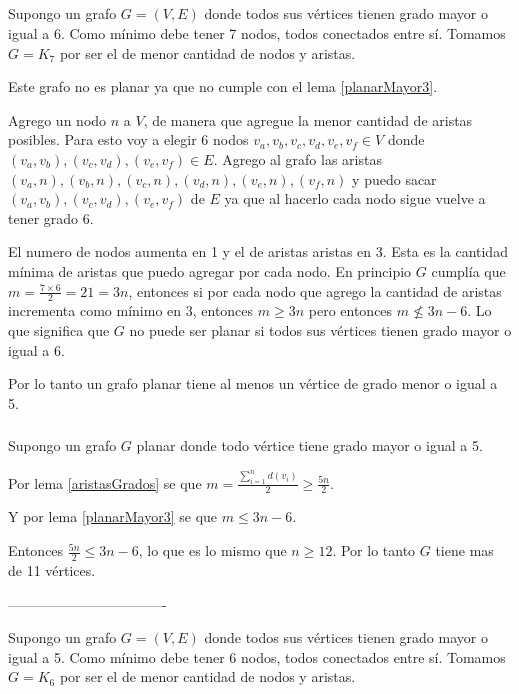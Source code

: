 \subsection{}

\subsubsection{}
Supongo un grafo $G = (V, E)$ donde todos sus vértices tienen grado mayor o igual a 6. Como mínimo debe tener 7 nodos, todos conectados entre sí. Tomamos $G = K_7$ por ser el de menor cantidad de nodos y aristas.

Este grafo no es planar ya que no cumple con el lema \ref{planarMayor3}.

Agrego un nodo $n$ a $V$, de manera que agregue la menor cantidad de aristas posibles. Para esto voy a elegir 6 nodos $v_a, v_b, v_c, v_d, v_e, v_f \in V$ donde $(v_a, v_b), (v_c, v_d), (v_e, v_f) \in E$. Agrego al grafo las aristas $(v_a, n), (v_b, n), (v_c, n), (v_d, n), (v_e, n), (v_f, n)$ y puedo sacar $(v_a, v_b), (v_c, v_d), (v_e, v_f)$ de $E$ ya que al hacerlo cada nodo sigue vuelve a tener grado 6.

El numero de nodos aumenta en 1 y el de aristas aristas en 3. Esta es la cantidad mínima de aristas que puedo agregar por cada nodo. En principio $G$ cumplía que $m = \frac{7 \times 6}{2} = 21 = 3n$, entonces si por cada nodo que agrego la cantidad de aristas incrementa como mínimo en 3, entonces $m \geq 3n$ pero entonces $m \not \leq 3n - 6$. Lo que significa que $G$ no puede ser planar si todos sus vértices tienen grado mayor o igual a 6.

Por lo tanto un grafo planar tiene al menos un vértice de grado menor o igual a 5.

\subsubsection{}
Supongo un grafo $G$ planar donde todo vértice tiene grado mayor o igual a 5.

Por lema \ref{aristasGrados} se que $m = \frac{\sum_{i = 1}^{n}d(v_i)}{2} \geq \frac{5n}{2}$.

Y por lema \ref{planarMayor3} se que $m \leq 3n - 6$.

Entonces $\frac{5n}{2} \leq 3n - 6$, lo que es lo mismo que $n \geq 12$. Por lo tanto $G$ tiene mas de 11 vértices.

----------------------------------

Supongo un grafo $G = (V, E)$ donde todos sus vértices tienen grado mayor o igual a 5. Como mínimo debe tener 6 nodos, todos conectados entre sí. Tomamos $G = K_6$ por ser el de menor cantidad de nodos y aristas.

